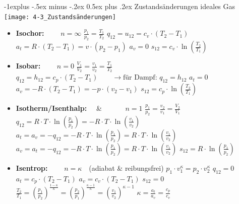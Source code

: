 \documentclass[10pt,a4paper,landscape, hidelinks]{article}
\makeatletter
\renewcommand{\subsection}{\@startsection{subsection}{2}{0mm}%
                                {-1explus -.5ex minus -.2ex}%
                                {0.5ex plus .2ex}%
                                {\normalfont\normalsize\bfseries}}
\makeatother
\begin{document}
\begin{multicols*}{3}
\subsection{Zustandsänderungen ideales Gas}
\texttt{[image: 4-3\_Zustandsänderungen]}
\begin{itemize}[leftmargin=*]
        \item [] \textbf{Isochor:}  $\qquad n=\infty$
        \subitem $\frac{p_1}{p_2}=\frac{T_1}{T_2}$
        \subitem $q_{12}=u_{12}=c_v\cdot(T_2-T_1)$
        \subitem $a_t=R\cdot(T_2-T_1)=v\cdot(p_2-p_1)$
        \subitem $a_v=0$
        \subitem $s_{12}=c_v\cdot\ln{\left(\frac{T_2}{T_1}\right)}$
        \item [] \textbf{Isobar:}  $\qquad n=0$
        \subitem $\frac{V_1}{V_2}=\frac{v_1}{v_2}=\frac{T_1}{T_2}$
        \subitem $q_{12}=h_{12}=c_p\cdot(T_2-T_1)\qquad\rightarrow\text{für Dampf: }q_{12}=h_{12}$
        \subitem $a_t=0$
        \subitem $a_v=-R\cdot(T_2-T_1)=-p\cdot(v_2-v_1)$
        \subitem $s_{12}=c_p\cdot\ln{\left(\frac{T_2}{T_1}\right)}$
        \item [] \textbf{Isotherm/Isenthalp:} $\quad$\&$\quad$ $\qquad n=1$
        \subitem $\frac{p_1}{p_2}=\frac{v_2}{v_1}=\frac{V_2}{V_1}$
        \subitem $q_{12}=R\cdot T\cdot\ln{\left(\frac{p_1}{p_2}\right)}=-R\cdot T\cdot\ln{\left(\frac{v_1}{v_2}\right)}$
        \subitem $a_t=a_v=-q_{12}=-R\cdot T\cdot\ln{\left(\frac{p_1}{p_2}\right)}=R\cdot T\cdot\ln{\left(\frac{v_1}{v_2}\right)}$
        \subitem $a_v=a_t=-q_{12}=-R\cdot T\cdot\ln{\left(\frac{p_1}{p_2}\right)}=R\cdot T\cdot\ln{\left(\frac{v_1}{v_2}\right)}$
        \subitem $s_{12}=R\cdot\ln{\left(\frac{p_1}{p_2}\right)}$
        \item [] \textbf{Isentrop:} $\qquad n=\kappa\quad${\scriptsize(adiabat \& reibungsfrei)}
        \subitem $p_1\cdot v_1^\kappa=p_2\cdot v_2^\kappa$
        \subitem $q_{12}=0$
        \subitem $a_t=c_p\cdot(T_2-T_1)$
        \subitem $a_v=c_v\cdot(T_2-T_1)$
        \subitem $s_{12}=0$
        \subitem $\frac{T_2}{T_1}=\left(\frac{p_1}{p_2}\right)^{\frac{1-\kappa}{\kappa}}=\left(\frac{p_2}{p_1}\right)^{\frac{\kappa-1}{\kappa}}=\left(\frac{v_1}{v_2}\right)^{\kappa-1}$
        \subitem $\kappa=\frac{a_t}{a_v}=\frac{c_p}{c_v}$

\columnbreak


\end{itemize}
\end{multicols*}
\end{document}
